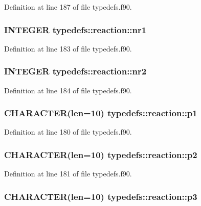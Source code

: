 Definition at line 187 of file typedefs.f90.\hypertarget{typetypedefs_1_1reaction_a92444b29e559f93abe272d1279e4d581}{
\subsubsection[{nr1}]{\setlength{\rightskip}{0pt plus 5cm}INTEGER {\bf typedefs::reaction::nr1}}}
\label{typetypedefs_1_1reaction_a92444b29e559f93abe272d1279e4d581}


Definition at line 183 of file typedefs.f90.\hypertarget{typetypedefs_1_1reaction_a7844e0a4df7c687802872bebb37fd187}{
\subsubsection[{nr2}]{\setlength{\rightskip}{0pt plus 5cm}INTEGER {\bf typedefs::reaction::nr2}}}
\label{typetypedefs_1_1reaction_a7844e0a4df7c687802872bebb37fd187}


Definition at line 184 of file typedefs.f90.\hypertarget{typetypedefs_1_1reaction_aa8086371c87bc65ef845558170090071}{
\subsubsection[{p1}]{\setlength{\rightskip}{0pt plus 5cm}CHARACTER(len=10) {\bf typedefs::reaction::p1}}}
\label{typetypedefs_1_1reaction_aa8086371c87bc65ef845558170090071}


Definition at line 180 of file typedefs.f90.\hypertarget{typetypedefs_1_1reaction_ace6c8faca4889c014c406c0f76c425e2}{
\subsubsection[{p2}]{\setlength{\rightskip}{0pt plus 5cm}CHARACTER(len=10) {\bf typedefs::reaction::p2}}}
\label{typetypedefs_1_1reaction_ace6c8faca4889c014c406c0f76c425e2}


Definition at line 181 of file typedefs.f90.\hypertarget{typetypedefs_1_1reaction_addfb09d35e61a0dbd2e86644d97d0da2}{
\subsubsection[{p3}]{\setlength{\rightskip}{0pt plus 5cm}CHARACTER(len=10) {\bf typedefs::reaction::p3}}}
\label{typetypedefs_1_1reaction_addfb09d35e61a0dbd2e86644d97d0da2}


